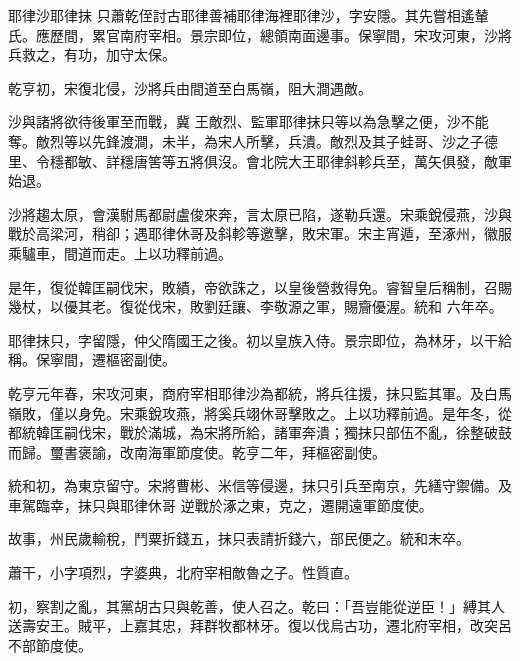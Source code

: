 
\begin{pinyinscope}

 耶律沙耶律抹
 只蕭乾侄討古耶律善補耶律海裡耶律沙，字安隱。其先嘗相遙輦氏。應歷間，累官南府宰相。景宗即位，總領南面邊事。保寧間，宋攻河東，沙將兵救之，有功，加守太保。



 乾亨初，宋復北侵，沙將兵由間道至白馬嶺，阻大澗遇敵。



 沙與諸將欲待後軍至而戰，冀
 王敵烈、監軍耶律抹只等以為急擊之便，沙不能奪。敵烈等以先鋒渡澗，未半，為宋人所擊，兵潰。敵烈及其子蛙哥、沙之子德里、令穩都敏、詳穩唐筈等五將俱沒。會北院大王耶律斜軫兵至，萬矢俱發，敵軍始退。



 沙將趨太原，會漢駙馬都尉盧俊來奔，言太原已陷，遂勒兵還。宋乘銳侵燕，沙與戰於高梁河，稍卻；遇耶律休哥及斜軫等邀擊，敗宋軍。宋主宵遁，至涿州，徽服乘驢車，間道而走。上以功釋前過。



 是年，復從韓匡嗣伐宋，敗績，帝欲誅之，以皇後營救得免。睿智皇后稱制，召賜幾杖，以優其老。復從伐宋，敗劉廷讓、李敬源之軍，賜齎優渥。統和
 六年卒。



 耶律抹只，字留隱，仲父隋國王之後。初以皇族入侍。景宗即位，為林牙，以干給稱。保寧間，遷樞密副使。



 乾亨元年春，宋攻河東，商府宰相耶律沙為都統，將兵往援，抹只監其軍。及白馬嶺敗，僅以身免。宋乘銳攻燕，將奚兵翊休哥擊敗之。上以功釋前過。是年冬，從都統韓匡嗣伐宋，戰於滿城，為宋將所給，諸軍奔潰；獨抹只部伍不亂，徐整破鼓而歸。璽書褒諭，改南海軍節度使。乾亨二年，拜樞密副使。



 統和初，為東京留守。宋將曹彬、米信等侵邊，抹只引兵至南京，先繕守禦備。及車駕臨幸，抹只與耶律休哥
 逆戰於涿之東，克之，遷開遠軍節度使。



 故事，州民歲輸稅，鬥粟折錢五，抹只表請折錢六，部民便之。統和末卒。



 蕭干，小字項烈，字婆典，北府宰相敵魯之子。性質直。



 初，察割之亂，其黨胡古只與乾善，使人召之。乾曰：「吾豈能從逆臣！」縛其人送壽安王。賊平，上嘉其忠，拜群牧都林牙。復以伐烏古功，遷北府宰相，改突呂不部節度使。




\end{pinyinscope}
